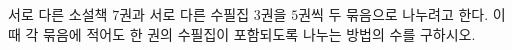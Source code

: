 서로 다른 소설책 $7$권과 서로 다른 수필집 $3$권을 $5$권씩 두 묶음으로 나누려고 한다. 이때 각 묶음에 적어도 한 권의 수필집이 포함되도록 나누는 방법의 수를 구하시오.
